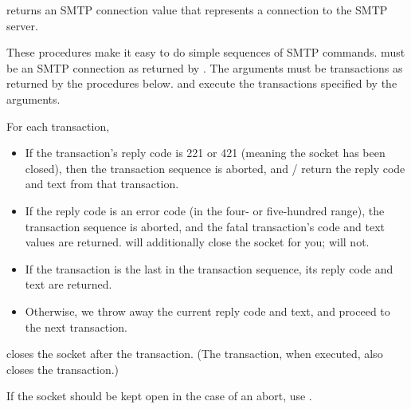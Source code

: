\begin{desc}
   returns an SMTP connection value that represents
  a connection to the SMTP server.
\end{desc}

\begin{desc}
  These procedures make it easy to do simple sequences of SMTP
  commands.   must be an SMTP connection as
  returned by .  The  arguments must
  be transactions as returned by the procedures below.
   and  execute
  the transactions specified by the arguments.

  For each transaction,
  \begin{itemize}
  \item If the transaction's reply code is 221 or 421 (meaning the socket has
    been closed), then the transaction sequence is aborted, and 
    / return the
    reply code and text from that  transaction.
  \item If the reply code is an error code (in the four- or five-hundred range), 
    the transaction sequence is aborted, and the fatal transaction's code
    and text values are returned.   will additionally
    close the socket for you;  will not.
  \item  If the transaction is the last in the transaction sequence, 
    its reply code and text are returned.
  \item Otherwise, we throw away the current reply code and text, and
    proceed to the next transaction.
  \end{itemize}
   closes the socket after the transaction.  (The
   transaction, when executed, also closes the transaction.)
  
  If the socket should be kept open in the case of an abort, use
  .
\end{desc}


